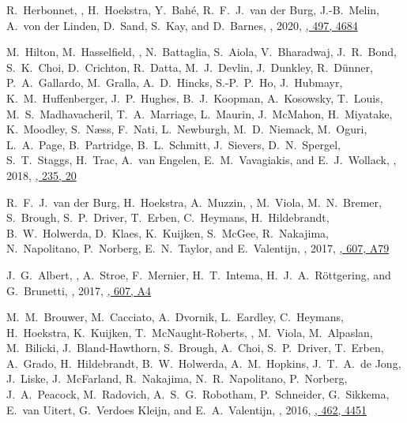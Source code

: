 \item
R.~Herbonnet, \myself, H.~Hoekstra, Y.~Bahé, R.~F.~J.~van der Burg, J.-B.~Melin, A.~von der Linden, D.~Sand, S.~Kay, and D.~Barnes,
,
2020, \href{https://ui.adsabs.harvard.edu/abs/2020MNRAS.497.4684H}{\mnras, 497, 4684}

\item
M.~Hilton, M.~Hasselfield, \myself, N.~Battaglia, S.~Aiola, V.~Bharadwaj, J.~R.~Bond, S.~K.~Choi, D.~Crichton, R.~Datta, M.~J.~Devlin, J.~Dunkley, R.~Dünner, P.~A.~Gallardo, M.~Gralla, A.~D.~Hincks, S.-P.~P.~Ho, J.~Hubmayr, K.~M.~Huffenberger, J.~P.~Hughes, B.~J.~Koopman, A.~Kosowsky, T.~Louis, M.~S.~Madhavacheril, T.~A.~Marriage, L.~Maurin, J.~McMahon, H.~Miyatake, K.~Moodley, S.~Næss, F.~Nati, L.~Newburgh, M.~D.~Niemack, M.~Oguri, L.~A.~Page, B.~Partridge, B.~L.~Schmitt, J.~Sievers, D.~N.~Spergel, S.~T.~Staggs, H.~Trac, A.~van Engelen, E.~M.~Vavagiakis, and E.~J.~Wollack,
,
2018, \href{https://ui.adsabs.harvard.edu/abs/2018ApJS..235...20H}{\apjs, 235, 20}

\item
R.~F.~J.~van der Burg, H.~Hoekstra, A.~Muzzin, \myself, M.~Viola, M.~N.~Bremer, S.~Brough, S.~P.~Driver, T.~Erben, C.~Heymans, H.~Hildebrandt, B.~W.~Holwerda, D.~Klaes, K.~Kuijken, S.~McGee, R.~Nakajima, N.~Napolitano, P.~Norberg, E.~N.~Taylor, and E.~Valentijn,
,
2017, \href{https://ui.adsabs.harvard.edu/abs/2017A&A...607A..79V}{\aap, 607, A79}

\item
J.~G.~Albert, \myself, A.~Stroe, F.~Mernier, H.~T.~Intema, H.~J.~A.~Röttgering, and G.~Brunetti,
,
2017, \href{https://ui.adsabs.harvard.edu/abs/2017A&A...607A...4A}{\aap, 607, A4}

\item
M.~M.~Brouwer, M.~Cacciato, A.~Dvornik, L.~Eardley, C.~Heymans, H.~Hoekstra, K.~Kuijken, T.~McNaught-Roberts, \myself, M.~Viola, M.~Alpaslan, M.~Bilicki, J.~Bland-Hawthorn, S.~Brough, A.~Choi, S.~P.~Driver, T.~Erben, A.~Grado, H.~Hildebrandt, B.~W.~Holwerda, A.~M.~Hopkins, J.~T.~A.~de Jong, J.~Liske, J.~McFarland, R.~Nakajima, N.~R.~Napolitano, P.~Norberg, J.~A.~Peacock, M.~Radovich, A.~S.~G.~Robotham, P.~Schneider, G.~Sikkema, E.~van Uitert, G.~Verdoes Kleijn, and E.~A.~Valentijn,
,
2016, \href{https://ui.adsabs.harvard.edu/abs/2016MNRAS.462.4451B}{\mnras, 462, 4451}

